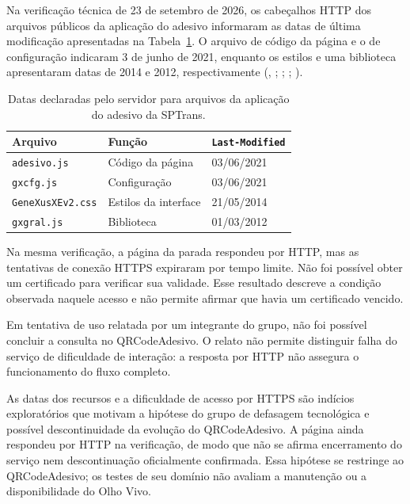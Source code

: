 \documentclass[12pt,oneside,a4paper,brazil,chapter=TITLE]{abntex2}
\begin{document}
\clearpage
Na verificação técnica de 23 de setembro de 2026, os cabeçalhos HTTP dos arquivos públicos da aplicação do adesivo informaram as datas de última modificação apresentadas na Tabela~\ref{tab:sptrans-modificacao}. O arquivo de código da página e o de configuração indicaram 3 de junho de 2021, enquanto os estilos e uma biblioteca apresentaram datas de 2014 e 2012, respectivamente (\citeauthor{sptransadesivojs}, \citeyear{sptransadesivojs}; \citeyear{sptranscss}; \citeyear{sptransgxcfg}; \citeyear{sptransgxgral}).

\begin{table}[H]
    \centering
    \caption{Datas declaradas pelo servidor para arquivos da aplicação do adesivo da SPTrans.}
    \label{tab:sptrans-modificacao}
    \begin{tabular}{lll}
        \hline
        Arquivo & Função & \texttt{Last-Modified} \\
        \hline
        \texttt{adesivo.js} & Código da página & 03/06/2021 \\
        \texttt{gxcfg.js} & Configuração & 03/06/2021 \\
        \texttt{GeneXusXEv2.css} & Estilos da interface & 21/05/2014 \\
        \texttt{gxgral.js} & Biblioteca & 01/03/2012 \\
        \hline
    \end{tabular}
\end{table}

Na mesma verificação, a página da parada respondeu por HTTP, mas as tentativas de conexão HTTPS expiraram por tempo limite. Não foi possível obter um certificado para verificar sua validade. Esse resultado descreve a condição observada naquele acesso e não permite afirmar que havia um certificado vencido.

Em tentativa de uso relatada por um integrante do grupo, não foi possível concluir a consulta no QRCodeAdesivo. O relato não permite distinguir falha do serviço de dificuldade de interação: a resposta por HTTP não assegura o funcionamento do fluxo completo.

As datas dos recursos e a dificuldade de acesso por HTTPS são indícios exploratórios que motivam a hipótese do grupo de defasagem tecnológica e possível descontinuidade da evolução do QRCodeAdesivo. A página ainda respondeu por HTTP na verificação, de modo que não se afirma encerramento do serviço nem descontinuação oficialmente confirmada. Essa hipótese se restringe ao QRCodeAdesivo; os testes de seu domínio não avaliam a manutenção ou a disponibilidade do Olho Vivo.
\end{document}
